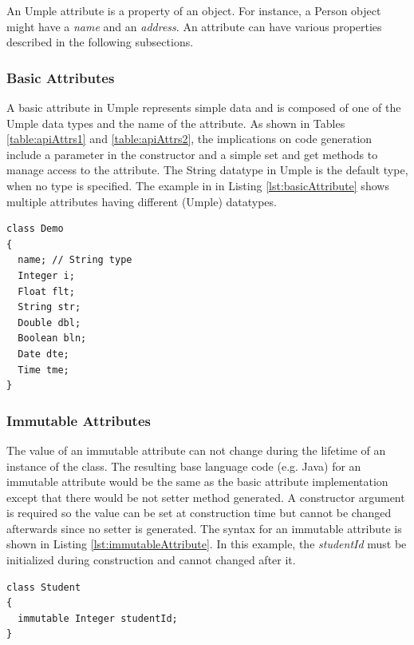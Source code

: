 An Umple attribute is a property of an object. For instance, 
a Person object might have a \textit{name} and an \textit{address}. 
An attribute can have various properties described in the following subsections.

\subsubsection{Basic Attributes}
A basic attribute in Umple represents simple data and is composed of one of the Umple data types and the name of the attribute. As shown in Tables \ref{table:apiAttrs1} and \ref{table:apiAttrs2}, the implications on code generation include a parameter in the constructor and a simple set and get methods to manage access to the attribute. The String datatype in Umple is the default type, when no type is specified. The example in in Listing \ref{lst:basicAttribute} shows multiple attributes having different (Umple) datatypes.


\begin{lstlisting}[style=umplePlain, label=lst:basicAttribute,caption=Basic Umple attribute]
class Demo 
{
  name; // String type
  Integer i;
  Float flt;
  String str;  
  Double dbl;
  Boolean bln;
  Date dte; 
  Time tme;
}
\end{lstlisting}

\subsubsection{Immutable Attributes}
The value of an immutable attribute can not change during the lifetime of an instance of the class. The resulting base language code (e.g. Java) for an immutable attribute would be the same as the basic attribute implementation except that there would be not setter method generated. A constructor argument is required so the value can be set at construction time but  cannot be changed afterwards since no setter is generated. The syntax for an immutable attribute is shown in Listing \ref{lst:immutableAttribute}. In this example, the \textit{studentId} must be initialized during construction and cannot changed after it. 

\begin{lstlisting}[style=umplePlain,label=lst:immutableAttribute, caption=Immutable Umple attribute]
class Student 
{
  immutable Integer studentId;
}
\end{lstlisting}

